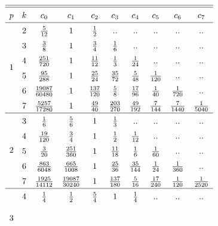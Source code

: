 \begin{table}[h]
	\begin{equation*}
		\def\arraystretch{1.5}
		\begin{array}{cccccccccc}
	\hline
	\hline
		\eqOrder & \taylorOrder & \correctorConstant{0} & \correctorConstant{1} & \correctorConstant{2} & \correctorConstant{3} & \correctorConstant{4} & \correctorConstant{5} & \correctorConstant{6} & \correctorConstant{7} \\
	\hline
		\multirow{6}{*}{1} 
		& 2 & \frac{5}{12} & 1 & \frac{1}{2} & \emptyTableEntry & \emptyTableEntry & \emptyTableEntry & \emptyTableEntry & \emptyTableEntry \\
		& 3 & \frac{3}{8} & 1 & \frac{3}{4} & \frac{1}{6} & \emptyTableEntry & \emptyTableEntry & \emptyTableEntry & \emptyTableEntry \\
		& 4 & \frac{251}{720} & 1 & \frac{11}{12} & \frac{1}{3} & \frac{1}{24} & \emptyTableEntry & \emptyTableEntry & \emptyTableEntry \\
		& 5 & \frac{95}{288} & 1 & \frac{25}{24} & \frac{35}{72} & \frac{5}{48} & \frac{1}{120} & \emptyTableEntry & \emptyTableEntry \\
		& 6 & \frac{19087}{60480} & 1 & \frac{137}{120} & \frac{5}{8} & \frac{17}{96} & \frac{1}{40} & \frac{1}{720} & \emptyTableEntry \\
		& 7 & \frac{5257}{17280} & 1 & \frac{49}{40} & \frac{203}{270} & \frac{49}{192} & \frac{7}{144} & \frac{7}{1440} & \frac{1}{5040} \\
	\hline
		\multirow{5}{*}{2} 
		& 3 & \frac{1}{6} & \frac{5}{6} & 1 & \frac{1}{3} & \emptyTableEntry & \emptyTableEntry & \emptyTableEntry & \emptyTableEntry \\
		& 4 & \frac{19}{120} & \frac{3}{4} & 1 & \frac{1}{2} & \frac{1}{12} & \emptyTableEntry & \emptyTableEntry & \emptyTableEntry \\
		& 5 & \frac{3}{20} & \frac{251}{360} & 1 & \frac{11}{18} & \frac{1}{6} & \frac{1}{60} & \emptyTableEntry & \emptyTableEntry \\
		& 6 & \frac{863}{6048} & \frac{665}{1008} & 1 & \frac{25}{36} & \frac{35}{144} & \frac{1}{24} & \frac{1}{360} & \emptyTableEntry \\
		& 7 & \frac{1925}{14112} & \frac{19087}{30240} & 1 & \frac{137}{180} & \frac{5}{16} & \frac{17}{240} & \frac{1}{120} & \frac{1}{2520} \\
	\hline
		\multirow{4}{*}{3} 
		& 4 & \frac{1}{4} & \frac{1}{2} & \frac{5}{4} & 1 & \frac{1}{4} & \emptyTableEntry & \emptyTableEntry & \emptyTableEntry \\

\end{array}
\end{equation*}
\end{table}
